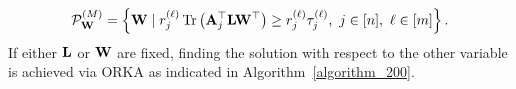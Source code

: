 \documentclass[12pt,draftcls,onecolumn]{IEEEtran}
\begin{document}
\begin{equation}
\label{kvm_17}
\mathcal{P}^{(M)}_{\mbW}=\left\{\mbW \mid r^{(\ell)}_{j}\operatorname{Tr}\left(\mbA^{\top}_j\mbL\mbW^{\top}\right)\geq r^{(\ell)}_{j}\tau^{(\ell)}_{j},~j\in[n],~\ell\in [m]\right\}.
\end{equation}\normalsize
If either $\mathbf{L}$ or $\mathbf{W}$ are fixed, finding the solution with respect to the other variable is achieved via ORKA as indicated in Algorithm~\ref{algorithm_200}.
\end{document}
